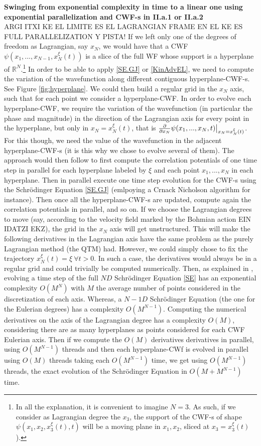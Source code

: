 \documentclass[11pt, a4paper]{article} %
\newcommand{\R}{\mathbb{R}} %
\DeclareRobustCommand{\mybox}[2][gray!10]{%
\begin{tcolorbox}[   %
        left=0.2cm,
        right=0.2cm,
        top=0.15cm,
        bottom=0.15cm,
        colback=#1,
        colframe=#1,
        width=\dimexpr\textwidth\relax, 
        enlarge left by=0mm,
        boxsep=5pt,
        arc=0pt,outer arc=0pt,
        ]
        #2
\end{tcolorbox}
}
\begin{document}
\mybox{
{\bf Swinging from exponential complexity in time to a linear one using exponential parallelization and CWF-s in II.a.1 or II.a.2\\ }
ARGI ITXI KE EL LIMITE ES EL LAGRANGIAN FRAME EN EL KE ES FULL PARALLELIZATION Y PISTA!
If we left only one of the degrees of freedom as Lagrangian, say $x_N$, we would have that a CWF $\psi(x_1,...,x_{N-1},x_N^\xi(t))$ is a slice of the full WF whose support is a hyperplane of $\R^N$.\footnote{In all the explanation, it is convenient to imagine $N=3$. As such, if we consider as Lagrangian degree the $x_3$, the support of the CWF-s of shape $\psi(x_1,x_2,x_3^\xi(t),t)$ will be a moving plane in $x_1,x_2$, sliced at $x_3=x_3^\xi(t)$).} In order to be able to apply \eqref{SE.GJ} or \eqref{KinAdvEL}, we need to compute the variation of the wavefunction along different contiguous hyperplane-CWF-s. See Figure \ref{fig:hyperplane}. We could then build a regular grid in the $x_N$ axis, such that for each point we consider a hyperplane-CWF. In order to evolve each hyperplane-CWF, we require the variation of the wavefunction (in particular the phase and magnitude) in the direction of the Lagrangian axis for every point in the hyperplane, but only in $x_N=x_N^\xi(t)$, that is $\pdv{}{x_N}\psi(x_1,...,x_N,t)\big\rvert_{x_N=x_N^\xi(t)}$. For this though, we need the value of the wavefunction in the adjacent hyperplane-CWF-s (it is this why we chose to evolve several of them). The approach would then follow to first compute the correlation potentials of one time step in parallel for each hyperplane labeled by $\xi$ and each point $x_1,...,x_N$ in each hyperplane. Then in parallel execute one time step evolution for the CWF-s using the Schrödinger Equation \eqref{SE.GJ} (emlpoying a Crnack Nicholson algorithm for instance). Then once all the hyperplane-CWF-s are updated, compute again the correlation potentials in parallel, and so on. If we choose the Lagrangian degrees to move (say, according to the velocity field marked by the Bohmian action EIN IDATZI EKZ), the grid in the $x_N$ axis will get unstructured. This will make the following derivatives in the Lagrangian axis have the same problem as the purely Lagrangian method (the QTM) had. However, we could simply chose to fix the trajectory $x_N^\xi(t)=\xi\ \forall t>0$. In such a case, the derivatives would always be in a regular grid and could trivially be computed  numerically. Then, as explained in \cite{NireTFGie}, evolving a time step of the full $ND$ Schrödinger Equation \eqref{SE} has an exponential complexity $O(M^N)$ with $M$ the average number of points considered in the discretization of each axis. Whereas, a $N-1D$ Schrödinger Equation (the one for the Eulerian degrees) has a complexity $O(M^{N-1})$. Computing the numerical derivatives on the axis of the Lagrangian degree has a complexity $O(M)$, considering there are as many hyperplanes as points considered for each CWF Eulerian axis. Then if we compute the $O(M)$ derivatives derivatives in parallel, using $O(M^{N-1})$ threads and then each hyperplane-CWf is evolved in parallel using $O(M)$ threads taking each $O(M^{N-1})$ time, we get using $O(M^{N-1})$ threads, the exact evolution of the Schrödinger Equation in $O(M+M^{N-1})$ time.}
\end{document}

